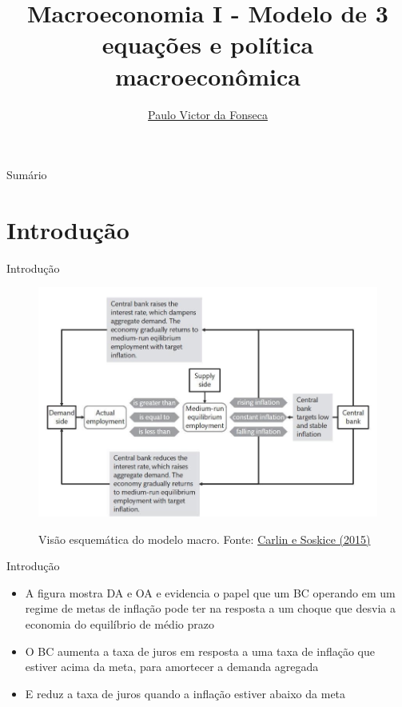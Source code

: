 \documentclass[10pt]{beamer}
\title[]{Macroeconomia I - Modelo de 3 equações e política macroeconômica}
\author[]{\href{https://pvfonseca.github.io}{Paulo Victor da Fonseca}}
\date{}
\begin{document}
\begin{frame}[plain]
\end{frame}

\begin{frame}{Sumário}
    \tableofcontents
\end{frame}

\section{Introdução}
\begin{frame}
    {Introdução}
    \begin{figure}
        \href{https://bookdown.org/robohay/economicsnotes/Figures/Policy/BoEFig.jpg}{\includegraphics[width=.65\textwidth]{./figures/aula15_fig3.jpg}}
        \caption{Visão esquemática do modelo macro. Fonte: \href{https://bookdown.org/robohay/economicsnotes/Figures/Policy/BoEFig.jpg}{Carlin e Soskice (2015)}}
    \end{figure}
\end{frame}

\begin{frame}
    {Introdução}
    \begin{itemize}
        \item A figura mostra DA e OA e evidencia o papel que um BC operando em um regime de metas de inflação pode ter na resposta a um choque que desvia a economia do equilíbrio de médio prazo\bigskip
        \item O BC aumenta a taxa de juros em resposta a uma taxa de inflação que estiver acima da meta, para amortecer a demanda agregada\bigskip
        \item E reduz a taxa de juros quando a inflação estiver abaixo da meta
    \end{itemize}
\end{frame}
\end{document}
